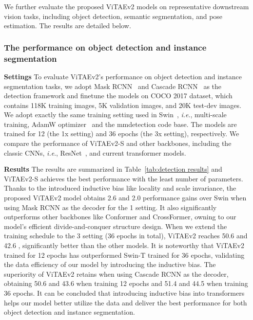 \documentclass[twocolumn]{svjour3}          \smartqed  \usepackage{natbib}
\newcommand{\ie}{i.e}
\def\onedot{.\xspace}
\def\ie{\emph{i.e}\onedot}
\begin{document}
We further evaluate the proposed ViTAEv2 models on representative downstream vision tasks, including object detection, semantic segmentation, and pose estimation. The results are detailed below.

\subsubsection{The performance on object detection and instance segmentation}

\textbf{Settings} To evaluate ViTAEv2's performance on object detection and instance segmentation tasks, we adopt Mask RCNN~\citep{he2017mask} and Cascade RCNN~\citep{cai2018cascade} as the detection framework and finetune the models on COCO 2017 dataset, which contains 118K training images, 5K validation images, and 20K test-dev images. We adopt exactly the same training setting used in Swin~\citep{liu2021swin}, \ie, multi-scale training, AdamW optimizer~\citep{loshchilov2017decoupled} and the mmdetection code base. The models are trained for 12 (the 1x setting) and 36 epochs (the 3x setting), respectively. We compare the performance of ViTAEv2-S and other backbones, including the classic CNNs, \ie, ResNet~\citep{he2016deep}, and current transformer models.

\noindent \textbf{Results} The results are summarized in Table~\ref{tab:detection results} and ViTAEv2-S achieves the best performance with the least number of parameters. Thanks to the introduced inductive bias like locality and scale invariance, the proposed ViTAEv2 model obtains 2.6  and 2.0  performance gains over Swin when using Mask RCNN as the decoder for the 1 setting. It also significantly outperforms other backbones like Conformer and CrossFormer, owning to our model's efficient divide-and-conquer structure design. When we extend the training schedule to the 3 setting (36 epochs in total), ViTAEv2 reaches 50.6  and 42.6 , significantly better than the other models. It is noteworthy that ViTAEv2 trained for 12 epochs has outperformed Swin-T trained for 36 epochs, validating the data efficiency of our model by introducing the inductive bias. The superiority of ViTAEv2 retains when using Cascade RCNN as the decoder, obtaining 50.6  and 43.6  when training 12 epochs and 51.4  and 44.5  when training 36 epochs. It can be concluded that introducing inductive bias into transformers helps our model better utilize the data and deliver the best performance for both object detection and instance segmentation.
\end{document}
